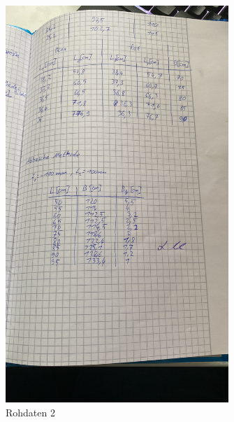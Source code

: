 \begin{figure}[H]
  \includegraphics[width=\textwidth, height=15cm, angle=270]{Bilder/Messdaten2.JPG}
  \caption{Rohdaten 2}
\end{figure}



